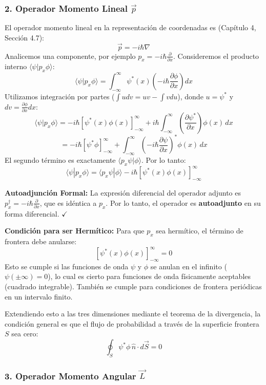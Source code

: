 \documentclass[a4paper]{article}
\begin{document}
\subsubsection{2. Operador Momento Lineal $\vec{p}$}

El operador momento lineal en la representación de coordenadas es (Capítulo 4, Sección 4.7):
$$
\vec{p} = -i\hbar \nabla
$$
Analicemos una componente, por ejemplo $p_x = -i\hbar \frac{\partial}{\partial x}$. Consideremos el producto interno $\langle \psi | p_x \phi \rangle$:
$$
\langle \psi | p_x \phi \rangle = \int_{-\infty}^{\infty} \psi^*(x) \left( -i\hbar \frac{\partial \phi}{\partial x} \right) dx
$$
Utilizamos integración por partes ($\int u dv = uv - \int v du$), donde $u = \psi^*$ y $dv = \frac{\partial \phi}{\partial x} dx$:
$$
\langle \psi | p_x \phi \rangle = -i\hbar \left[ \psi^*(x) \phi(x) \right]_{-\infty}^{\infty} + i\hbar \int_{-\infty}^{\infty} \left( \frac{\partial \psi^*}{\partial x} \right) \phi(x) \, dx
$$
$$
= -i\hbar \left[ \psi^* \phi \right]_{-\infty}^{\infty} + \int_{-\infty}^{\infty} \left( -i\hbar \frac{\partial \psi}{\partial x} \right)^* \phi(x) \, dx
$$
El segundo término es exactamente $\langle p_x \psi | \phi \rangle$. Por lo tanto:
$$
\langle \psi | p_x \phi \rangle = \langle p_x \psi | \phi \rangle - i\hbar \left[ \psi^*(x) \phi(x) \right]_{-\infty}^{\infty}
$$

\textbf{Autoadjunción Formal:}
La expresión diferencial del operador adjunto es $p_x^\dagger = -i\hbar \frac{\partial}{\partial x}$, que es idéntica a $p_x$. Por lo tanto, el operador es \textbf{autoadjunto} en su forma diferencial. $\checkmark$

\textbf{Condición para ser Hermítico:}
Para que $p_x$ sea hermítico, el término de frontera debe anularse:
$$
\left[ \psi^*(x) \phi(x) \right]_{-\infty}^{\infty} = 0
$$
Esto se cumple si las funciones de onda $\psi$ y $\phi$ se anulan en el infinito ($\psi(\pm \infty) = 0$), lo cual es cierto para funciones de onda físicamente aceptables (cuadrado integrable). También se cumple para condiciones de frontera periódicas en un intervalo finito.

Extendiendo esto a las tres dimensiones mediante el teorema de la divergencia, la condición general es que el flujo de probabilidad a través de la superficie frontera $S$ sea cero:
$$
\oint_S \psi^* \phi \, \hat{n} \cdot d\vec{S} = 0
$$

\subsubsection{3. Operador Momento Angular $\vec{L}$}
\end{document}
